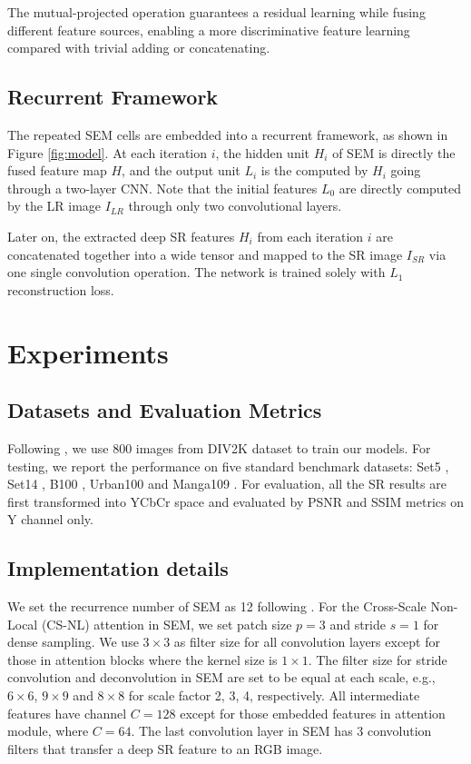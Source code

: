 \documentclass[10pt,twocolumn,letterpaper]{article}
\begin{document}
The mutual-projected operation guarantees a residual learning while fusing different feature sources, enabling a more discriminative feature learning compared with trivial adding or concatenating. 


 \subsection{Recurrent Framework}
The repeated SEM cells are embedded into a recurrent framework, as shown in Figure \ref{fig:model}. At each iteration $i$, the hidden unit $H_i$ of SEM is directly the fused feature map $H$, and the output unit $L_{i}$ is the computed by $H_{i}$ going through a two-layer CNN. Note that the initial features $L_0$ are directly computed by the LR image $I_{LR}$ through only two convolutional layers.   







Later on, the extracted deep SR features $H_i$ from each iteration $i$ are concatenated together into a wide tensor and mapped to the SR image $I_{SR}$ via one single convolution operation. The network is trained solely with $L_1$ reconstruction loss.


%
 

 
\section{Experiments}
\subsection{Datasets and Evaluation Metrics}
Following \cite{lim2017enhanced,zhang2019residual,zhang2018residual}, we use 800 images from DIV2K \cite{timofte2017ntire} dataset to train our models. For testing,  we report the performance on five standard benchmark datasets: Set5 \cite{bevilacqua2012low}, Set14 \cite{zeyde2010single}, B100 \cite{martin2001database}, Urban100 \cite{huang2015single} and Manga109 \cite{matsui2017sketch}. For evaluation, all the SR results are first transformed into YCbCr space and evaluated by PSNR and SSIM \cite{wang2004image} metrics
on Y channel only.

\subsection{Implementation details}
We set the recurrence number of SEM as 12 following \cite{liu2018non}. For the Cross-Scale Non-Local (CS-NL) attention in SEM, we set patch size $p=3$ and stride $s=1$ for dense sampling. We use $3\times 3$ as filter size for all convolution layers except for those in attention blocks where the kernel size is $1\times 1$. The filter size for stride convolution and deconvolution in SEM are set to be equal at each scale, e.g., $6\times 6$, $9\times 9$ and $8\times8$ for scale factor 2, 3, 4, respectively. All intermediate features have channel $C=128$ except for those embedded features in attention module, where $C=64$. The last convolution layer in SEM has 3 convolution filters that transfer a deep SR feature to an RGB image. 
\end{document}
